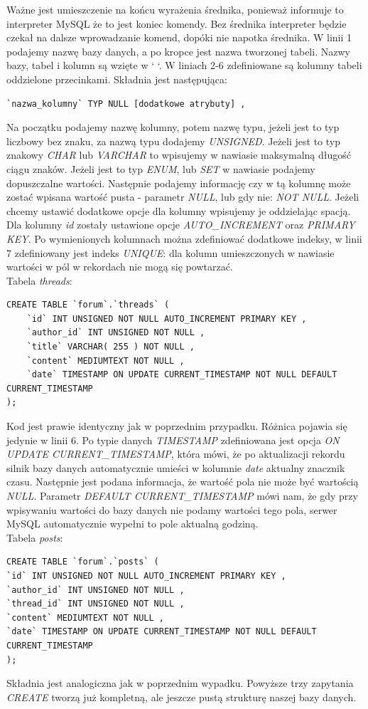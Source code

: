 \documentclass[a4paper,10pt]{article}
\begin{document}
Ważne jest umieszczenie na końcu wyrażenia średnika, ponieważ informuje to interpreter MySQL że to jest koniec komendy. Bez średnika interpreter będzie czekał na dalsze wprowadzanie komend, dopóki nie napotka średnika.
W linii 1 podajemy nazwę bazy danych, a po kropce jest nazwa tworzonej tabeli. Nazwy bazy, tabel i kolumn są wzięte w ` `. W liniach 2-6 zdefiniowane są kolumny tabeli oddzielone przecinkami. Składnia jest następująca: \\
\begin{verbatim}
`nazwa_kolumny` TYP NULL [dodatkowe atrybuty] ,
\end{verbatim}
Na początku podajemy nazwę kolumny, potem nazwę typu, jeżeli jest to typ liczbowy bez znaku, za nazwą typu dodajemy \textit{UNSIGNED}. Jeżeli jest to typ znakowy \textit{CHAR} lub \textit{VARCHAR} to wpisujemy w nawiasie maksymalną długość ciągu znaków. Jeżeli jest to typ \textit{ENUM}, lub \textit{SET} w nawiasie podajemy dopuszczalne wartości. Następnie podajemy informację czy w tą kolumnę może zostać wpisana wartość pusta - parametr \textit{NULL}, lub gdy nie: \textit{NOT NULL}. Jeżeli chcemy ustawić dodatkowe opcje dla kolumny wpisujemy je oddzielając spacją. Dla kolumny \textit{id} zostały ustawione opcje \textit{AUTO\_INCREMENT} oraz \textit{PRIMARY KEY}. Po wymienionych kolumnach można zdefiniować dodatkowe indeksy, w linii 7 zdefiniowany jest indeks \textit{UNIQUE}: dla kolumn umieszczonych w nawiasie wartości w pól w rekordach nie mogą się powtarzać. \\
Tabela \textit{threads}: \\
\begin{verbatim}
CREATE TABLE `forum`.`threads` (
	`id` INT UNSIGNED NOT NULL AUTO_INCREMENT PRIMARY KEY ,
	`author_id` INT UNSIGNED NOT NULL ,
	`title` VARCHAR( 255 ) NOT NULL ,
	`content` MEDIUMTEXT NOT NULL ,
	`date` TIMESTAMP ON UPDATE CURRENT_TIMESTAMP NOT NULL DEFAULT CURRENT_TIMESTAMP 
);
\end{verbatim}
Kod jest prawie identyczny jak w poprzednim przypadku. Różnica pojawia się jedynie w linii 6. Po typie danych \textit{TIMESTAMP} zdefiniowana jest opcja \textit{ON UPDATE CURRENT\_TIMESTAMP}, która mówi, że po aktualizacji rekordu silnik bazy danych automatycznie umieści w kolumnie \textit{date} aktualny znacznik czasu. Następnie jest podana informacja, że wartość pola nie może być wartością \textit{NULL}. Parametr \textit{DEFAULT CURRENT\_TIMESTAMP} mówi nam, że gdy przy wpisywaniu wartości do bazy danych nie podamy wartości tego pola, serwer MySQL automatycznie wypełni to pole aktualną godziną. \\
Tabela \textit{posts}: \\
\begin{verbatim}
CREATE TABLE `forum`.`posts` (
`id` INT UNSIGNED NOT NULL AUTO_INCREMENT PRIMARY KEY ,
`author_id` INT UNSIGNED NOT NULL ,
`thread_id` INT UNSIGNED NOT NULL ,
`content` MEDIUMTEXT NOT NULL ,
`date` TIMESTAMP ON UPDATE CURRENT_TIMESTAMP NOT NULL DEFAULT CURRENT_TIMESTAMP 
);
\end{verbatim}
Składnia jest analogiczna jak w poprzednim wypadku. Powyższe trzy zapytania \textit{CREATE} tworzą już kompletną, ale jeszcze pustą strukturę naszej bazy danych.
\end{document}
